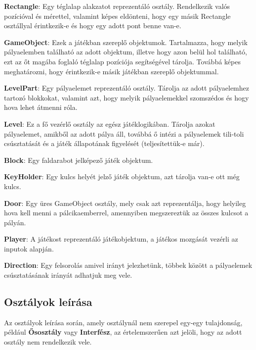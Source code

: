 \textbf{Rectangle}: Egy téglalap alakzatot reprezentáló osztály. Rendelkezik valós pozícióval és mérettel, valamint képes eldönteni, hogy egy másik Rectangle osztállyal érintkezik-e és hogy egy adott pont benne van-e.

\textbf{GameObject}: Ezek a játékban szereplő objektumok. Tartalmazza, hogy melyik pályaelemben található az adott objektum, illetve hogy azon belül hol található, ezt az őt magába foglaló téglalap pozíciója segítségével tárolja. Továbbá képes meghatározni, hogy érintkezik-e másik játékban szereplő objektummal.

\textbf{LevelPart}: Egy pályaelemet reprezentáló osztály. Tárolja az adott pályaelemhez tartozó blokkokat, valamint azt, hogy melyik pályaelemekkel szomszédos és hogy hova lehet átmenni róla.

\textbf{Level}: Ez a fő vezérlő osztály az egész játéklogikában. Tárolja azokat pályaelemet, amikből az adott pálya áll, továbbá ő intézi a pályaelemek tili-toli csúsztatását és a játék állapotának figyelését (teljesítettük-e már).

\textbf{Block}: Egy faldarabot jelképező játék objektum. 

\textbf{KeyHolder}: Egy kulcs helyét jelző játék objektum, azt tárolja van-e ott még kulcs.

\textbf{Door}: Egy üres GameObject osztály, mely csak azt reprezentálja, hogy helyileg hova kell menni a pálcikaemberrel, amennyiben megszereztük az összes kulcsot a pályán.

\textbf{Player}: A játékost reprezentáló játékobjektum, a játékos mozgását vezérli az inputok alapján.

\textbf{Direction}: Egy felsorolás amivel irányt jelezhetünk, többek között a pályaelemek csúsztatásának irányát adhatjuk meg vele.

\subsection{Osztályok leírása}

Az osztályok leírása során, amely osztálynál nem szerepel egy-egy tulajdonság, például \textbf{Ősosztály} vagy \textbf{Interfész}, az értelemszerűen azt jelöli, hogy az adott osztály nem rendelkezik vele.

